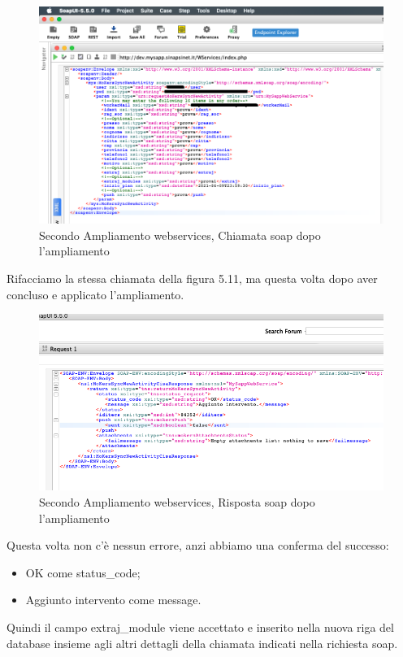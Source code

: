 \begin{figure}[!h] 
	\centering
	\includegraphics[scale = 0.5]{immagini/webservices/ampliamenti/accettazione/2ampl_soap_chiamata_premodifica.png}
	\caption{Secondo Ampliamento webservices, Chiamata \gls{soap} dopo l'ampliamento}
\end{figure}

\begin{flushleft}
	Rifacciamo la stessa chiamata della figura 5.11, ma questa volta dopo aver concluso e applicato l'ampliamento.
\end{flushleft}

\begin{figure}[!h] 
	\centering
	\includegraphics[scale = 0.5]{immagini/webservices/ampliamenti/accettazione/2ampl_soap_risposta_postmodifica.png}
	\caption{Secondo Ampliamento webservices, Risposta \gls{soap} dopo l'ampliamento}
\end{figure}
\begin{flushleft}
	Questa volta non c'è nessun errore, anzi abbiamo una conferma del successo:
	\begin{itemize}
		\item OK come status\_code;
		\item Aggiunto intervento come message.
	\end{itemize}
	
	Quindi il campo extraj\_module viene accettato e inserito nella nuova riga del database insieme agli altri dettagli della chiamata indicati nella richiesta \gls{soap}.
\end{flushleft}
\newpage

